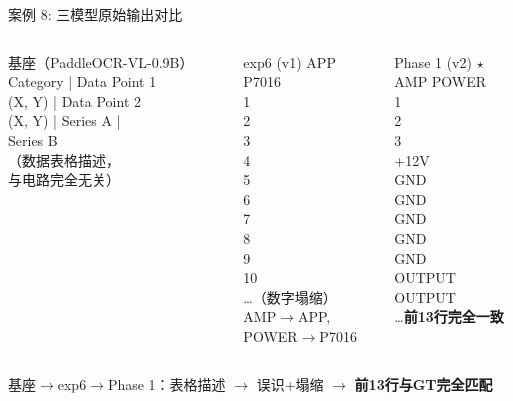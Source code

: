 \documentclass[10pt,aspectratio=169,table]{beamer}
\begin{document}
\begin{frame}{案例 8: 三模型原始输出对比}
  \begin{columns}[T]
      \begin{block}{\footnotesize 基座（PaddleOCR-VL-0.9B）}
        \ttfamily\tiny
        Category | Data Point 1\\
        (X, Y) | Data Point 2\\
        (X, Y) | Series A |\\
        Series B\\
        （数据表格描述，\\
        与电路完全无关）
      \end{block}
      \begin{block}{\footnotesize exp6 (v1)}
        \ttfamily\tiny
        APP P7016\\
        1\\
        2\\
        3\\
        4\\
        5\\
        6\\
        7\\
        8\\
        9\\
        10\\
        \ldots（数字塌缩）\\
        AMP$\to$APP, POWER$\to$P7016
      \end{block}
      \begin{block}{\footnotesize Phase 1 (v2) $\star$}
        \ttfamily\tiny
        AMP POWER\\
        1\\
        2\\
        3\\
        +12V\\
        GND\\
        GND\\
        GND\\
        GND\\
        GND\\
        OUTPUT\\
        OUTPUT\\
        \ldots\textbf{前13行完全一致}
      \end{block}
  \end{columns}
  \vspace{0.2cm}
  \begin{center}
    \footnotesize 基座$\to$exp6$\to$Phase 1：表格描述 $\to$ 误识+塌缩 $\to$ \textbf{前13行与GT完全匹配}
  \end{center}
\end{frame}
\end{document}
